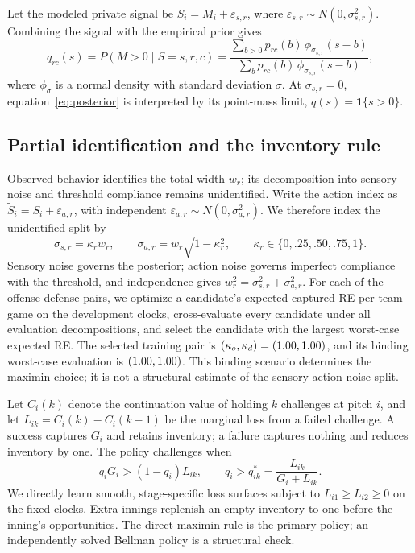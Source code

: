 \documentclass[12pt,letterpaper]{article}
\begin{document}
Let the modeled private signal be $S_i=M_i+\varepsilon_{s,r}$, where
$\varepsilon_{s,r}\sim N(0,\sigma_{s,r}^2)$. Combining the signal with the empirical
prior gives
\begin{equation}
  q_{rc}(s)=P(M>0\mid S=s,r,c)
  =\frac{\sum_{b>0}p_{rc}(b)\,\phi_{\sigma_{s,r}}(s-b)}
  {\sum_b p_{rc}(b)\,\phi_{\sigma_{s,r}}(s-b)},
  \label{eq:posterior}
\end{equation}
where $\phi_\sigma$ is a normal density with standard deviation $\sigma$.
At $\sigma_{s,r}=0$, equation~\eqref{eq:posterior} is interpreted by its
point-mass limit, $q(s)=\mathbf{1}\{s>0\}$.

\subsection{Partial identification and the inventory rule}

Observed behavior identifies the total width $w_r$; its decomposition into
sensory noise and threshold compliance remains unidentified. Write the action
index as $\widetilde S_i=S_i+\varepsilon_{a,r}$, with independent
$\varepsilon_{a,r}\sim N(0,\sigma_{a,r}^2)$. We therefore index the
unidentified split by
\begin{equation}
  \sigma_{s,r}=\kappa_r w_r,\qquad
  \sigma_{a,r}=w_r\sqrt{1-\kappa_r^2},
  \qquad \kappa_r\in\{0,.25,.50,.75,1\}.
  \label{eq:kappa}
\end{equation}
Sensory noise governs the posterior; action noise governs imperfect compliance
with the threshold, and independence gives
$w_r^2=\sigma_{s,r}^2+\sigma_{a,r}^2$. For each of the
\DevelopmentScenarioCount{} offense-defense pairs, we optimize a candidate's
expected captured RE per team-game on the
\DevelopmentTrainingGames{} development clocks, cross-evaluate every candidate
under all \DevelopmentScenarioCount{} evaluation decompositions, and select the
candidate with the largest worst-case expected RE. The selected training pair
is $(\kappa_o,\kappa_d)=(1.00,1.00)$, and its
binding worst-case evaluation is
$(1.00,1.00)$. This binding scenario determines
the maximin choice; it is not a structural estimate of the sensory-action noise
split.

Let $C_i(k)$ denote the continuation value of holding $k$ challenges at pitch
$i$, and let $L_{ik}=C_i(k)-C_i(k-1)$ be the marginal loss from a failed
challenge. A success captures $G_i$ and retains inventory; a failure captures
nothing and reduces inventory by one. The policy challenges when
\begin{equation}
  q_iG_i>(1-q_i)L_{ik},
  \qquad
  q_i>q_{ik}^{*}=\frac{L_{ik}}{G_i+L_{ik}}.
  \label{eq:decision}
\end{equation}
We directly learn smooth, stage-specific loss surfaces subject to
$L_{i1}\ge L_{i2}\ge0$ on the fixed clocks. Extra innings replenish an empty
inventory to one before the inning's opportunities. The direct maximin rule is
the primary policy; an independently solved Bellman policy is a structural
check.
\end{document}
